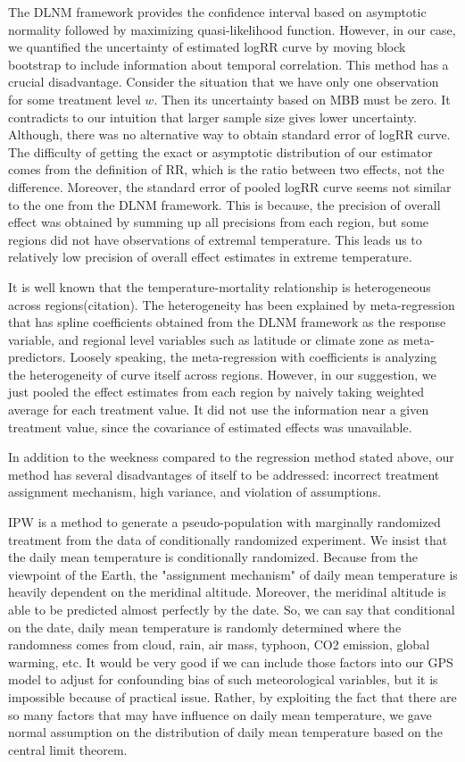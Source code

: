 \documentclass[12pt]{article}
\begin{document}
The DLNM framework provides the confidence interval based on asymptotic normality 
followed by maximizing quasi-likelihood function.
However, in our case, we quantified the uncertainty of estimated logRR curve by moving block bootstrap
to include information about temporal correlation.
This method has a crucial disadvantage.
Consider the situation that we have only one observation for some treatment level $w$.
Then its uncertainty based on MBB must be zero.
It contradicts to our intuition that larger sample size gives lower uncertainty.
Although, there was no alternative way to obtain standard error of logRR curve.
The difficulty of getting the exact or asymptotic distribution of our estimator
comes from the definition of RR, which is the ratio between two effects, not the difference.
Moreover, the standard error of pooled logRR curve seems not similar to the one from the DLNM framework.
This is because,
the precision of overall effect was obtained by summing up all precisions from each region,
but some regions did not have observations of extremal temperature.
This leads us to relatively low precision of overall effect estimates in extreme temperature.

It is well known that the temperature-mortality relationship is heterogeneous across regions(citation).
The heterogeneity has been explained by meta-regression
that has spline coefficients obtained from the DLNM framework as the response variable, 
and regional level variables such as latitude or climate zone as meta-predictors.
Loosely speaking, the meta-regression with coefficients
is analyzing the heterogeneity of curve itself across regions.
However, in our suggestion, we just pooled the effect estimates from each region 
by naively taking weighted average for each treatment value.
It did not use the information near a given treatment value,
since the covariance of estimated effects was unavailable.

In addition to the weekness compared to the regression method stated above,
our method has several disadvantages of itself to be addressed:
incorrect treatment assignment mechanism, high variance, and violation of assumptions.

IPW is a method to generate a pseudo-population with marginally randomized treatment
from the data of conditionally randomized experiment.
We insist that the daily mean temperature is conditionally randomized.
Because from the viewpoint of the Earth, 
the "assignment mechanism" of daily mean temperature is heavily dependent on the meridinal altitude.
Moreover, the meridinal altitude is able to be predicted almost perfectly by the date.
So, we can say that conditional on the date, daily mean temperature is randomly determined
where the randomness comes from cloud, rain, air mass, typhoon, CO2 emission, global warming, etc.
It would be very good if we can include those factors into our GPS model 
to adjust for confounding bias of such meteorological variables,
but it is impossible because of practical issue.
Rather, by exploiting the fact that 
there are so many factors that may have influence on daily mean temperature,
we gave normal assumption on the distribution of daily mean temperature 
based on the central limit theorem.
\end{document}
